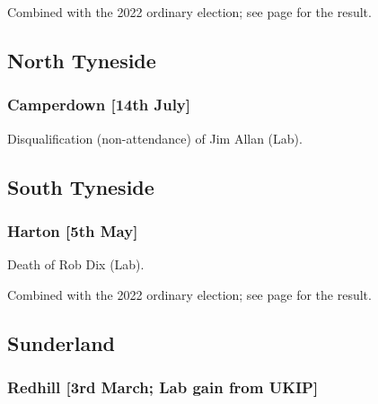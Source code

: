 \documentclass[a4paper,openany]{book}
\begin{document}
\begin{resultsiii}
Combined with the 2022 ordinary election; see page \pageref{NewcastleTyneBenwellScotswood} for the result.

\subsection*{North Tyneside}

\subsubsection*{Camperdown \hspace*{\fill}\nolinebreak[1]%
	\enspace\hspace*{\fill}
	[14th July]}


Disqualification (non-attendance) of Jim Allan (Lab).

\subsection*{South Tyneside}

\subsubsection*{Harton \hspace*{\fill}\nolinebreak[1]%
	\enspace\hspace*{\fill}
	[5th May]}


Death of Rob Dix (Lab).

Combined with the 2022 ordinary election; see page \pageref{SouthTynesideHarton} for the result.

\subsection*{Sunderland}

\subsubsection*{Redhill \hspace*{\fill}\nolinebreak[1]%
	\enspace\hspace*{\fill}
	[3rd March; Lab gain from UKIP]}



\end{resultsiii}
\end{document}

